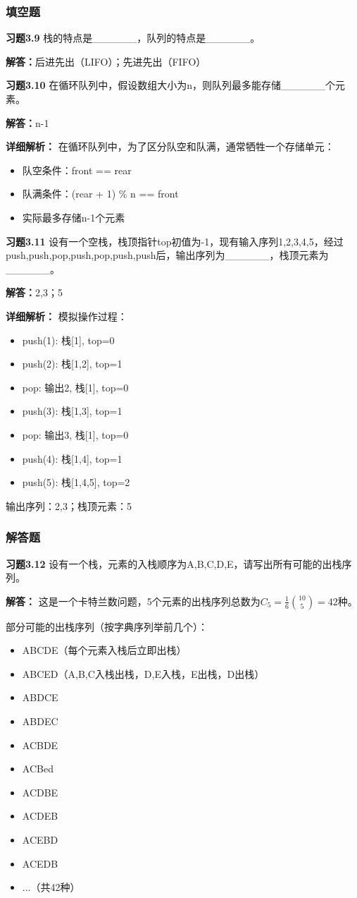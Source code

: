 \documentclass[12pt,a4paper]{amsart}
\begin{document}
\subsubsection{填空题}

\textbf{习题3.9} 栈的特点是\_\_\_\_\_\_，队列的特点是\_\_\_\_\_\_。

\textbf{解答：}后进先出（LIFO）；先进先出（FIFO）

\textbf{习题3.10} 在循环队列中，假设数组大小为n，则队列最多能存储\_\_\_\_\_\_个元素。

\textbf{解答：}n-1

\textbf{详细解析：}
在循环队列中，为了区分队空和队满，通常牺牲一个存储单元：
\begin{itemize}
\item 队空条件：front == rear
\item 队满条件：(rear + 1) \% n == front
\item 实际最多存储n-1个元素
\end{itemize}

\textbf{习题3.11} 设有一个空栈，栈顶指针top初值为-1，现有输入序列1,2,3,4,5，经过push,push,pop,push,pop,push,push后，输出序列为\_\_\_\_\_\_，栈顶元素为\_\_\_\_\_\_。

\textbf{解答：}2,3；5

\textbf{详细解析：}
模拟操作过程：
\begin{itemize}
\item push(1): 栈[1], top=0
\item push(2): 栈[1,2], top=1
\item pop: 输出2, 栈[1], top=0
\item push(3): 栈[1,3], top=1
\item pop: 输出3, 栈[1], top=0
\item push(4): 栈[1,4], top=1
\item push(5): 栈[1,4,5], top=2
\end{itemize}
输出序列：2,3；栈顶元素：5

\subsubsection{解答题}

\textbf{习题3.12} 设有一个栈，元素的入栈顺序为A,B,C,D,E，请写出所有可能的出栈序列。

\textbf{解答：}
这是一个卡特兰数问题，5个元素的出栈序列总数为$C_5 = \frac{1}{6}\binom{10}{5} = 42$种。

部分可能的出栈序列（按字典序列举前几个）：
\begin{itemize}
\item ABCDE（每个元素入栈后立即出栈）
\item ABCED（A,B,C入栈出栈，D,E入栈，E出栈，D出栈）
\item ABDCE
\item ABDEC
\item ACBDE
\item ACBed
\item ACDBE
\item ACDEB
\item ACEBD
\item ACEDB
\item ...（共42种）
\end{itemize}
\end{document}

